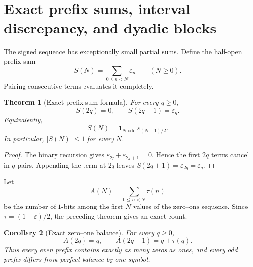 \documentclass[11pt,oneside]{article}
\newtheorem{theorem}{Theorem}[section]
\newtheorem{corollary}[theorem]{Corollary}
\theoremstyle{definition}
\theoremstyle{remark}
\newcommand{\ind}{\mathbf 1}
\begin{document}
\section{Exact prefix sums, interval discrepancy, and dyadic blocks}
\label{sec:prefix-balance}

The signed sequence has exceptionally small partial sums.  Define the half-open
prefix sum
\begin{equation}
  S(N)=\sum_{0\le n<N}\varepsilon_n
  \qquad(N\ge0).                                           \label{eq:prefix-S-definition}
\end{equation}
Pairing consecutive terms evaluates it completely.

\begin{theorem}[Exact prefix-sum formula]
\label{thm:exact-prefix-sum}
For every $q\ge0$,
\begin{equation}
  \boxed{\displaystyle
  S(2q)=0,
  \qquad
  S(2q+1)=\varepsilon_q.}                                  \label{eq:exact-prefix-sum}
\end{equation}
Equivalently,
\begin{equation}
  S(N)=\ind_{N\text{ odd}}\,
       \varepsilon_{(N-1)/2}.                              \label{eq:prefix-indicator-form}
\end{equation}
In particular, $|S(N)|\le1$ for every $N$.
\end{theorem}

\begin{proof}
The binary recursion gives
$\varepsilon_{2j}+\varepsilon_{2j+1}=0$.  Hence the first $2q$ terms
cancel in $q$ pairs.  Appending the term at $2q$ leaves
$S(2q+1)=\varepsilon_{2q}=\varepsilon_q$.
\end{proof}

Let
\begin{equation}
  A(N)=\sum_{0\le n<N}\tau(n)                              \label{eq:prefix-A-definition}
\end{equation}
be the number of $1$-bits among the first $N$ values of the zero--one sequence.
Since $\tau=(1-\varepsilon)/2$, the preceding theorem gives an exact count.

\begin{corollary}[Exact zero--one balance]
\label{cor:exact-zero-one-balance}
For every $q\ge0$,
\begin{equation}
  \boxed{\displaystyle
  A(2q)=q,
  \qquad
  A(2q+1)=q+\tau(q).}                                      \label{eq:exact-one-count}
\end{equation}
Thus every even prefix contains exactly as many zeros as ones, and every odd
prefix differs from perfect balance by one symbol.
\end{corollary}
\end{document}
